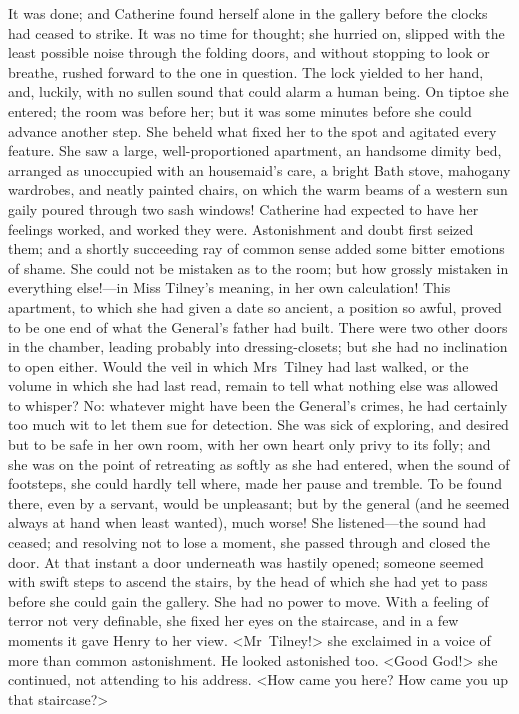  It was done; and Catherine found herself alone in the gallery before the clocks had ceased to strike. It was no time for thought; she hurried on, slipped with the least possible noise through the folding doors, and without stopping to look or breathe, rushed forward to the one in question. The lock yielded to her hand, and, luckily, with no sullen sound that could alarm a human being. On tiptoe she entered; the room was before her; but it was some minutes before she could advance another step. She beheld what fixed her to the spot and agitated every feature. She saw a large, well-proportioned apartment, an handsome dimity bed, arranged as unoccupied with an housemaid's care, a bright Bath stove, mahogany wardrobes, and neatly painted chairs, on which the warm beams of a western sun gaily poured through two sash windows! Catherine had expected to have her feelings worked, and worked they were. Astonishment and doubt first seized them; and a shortly succeeding ray of common sense added some bitter emotions of shame. She could not be mistaken as to the room; but how grossly mistaken in everything else!—in Miss Tilney's meaning, in her own calculation! This apartment, to which she had given a date so ancient, a position so awful, proved to be one end of what the General's father had built. There were two other doors in the chamber, leading probably into dressing-closets; but she had no inclination to open either. Would the veil in which Mrs~Tilney had last walked, or the volume in which she had last read, remain to tell what nothing else was allowed to whisper? No: whatever might have been the General's crimes, he had certainly too much wit to let them sue for detection. She was sick of exploring, and desired but to be safe in her own room, with her own heart only privy to its folly; and she was on the point of retreating as softly as she had entered, when the sound of footsteps, she could hardly tell where, made her pause and tremble. To be found there, even by a servant, would be unpleasant; but by the general (and he seemed always at hand when least wanted), much worse! She listened—the sound had ceased; and resolving not to lose a moment, she passed through and closed the door. At that instant a door underneath was hastily opened; someone seemed with swift steps to ascend the stairs, by the head of which she had yet to pass before she could gain the gallery. She had no power to move. With a feeling of terror not very definable, she fixed her eyes on the staircase, and in a few moments it gave Henry to her view. <Mr~Tilney!> she exclaimed in a voice of more than common astonishment. He looked astonished too. <Good God!> she continued, not attending to his address. <How came you here? How came you up that staircase?> 

